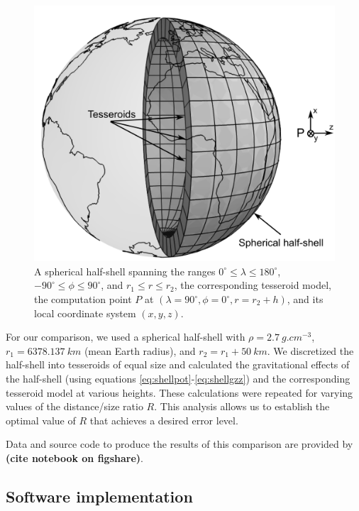 \documentclass[extra]{gji}
\begin{document}
\begin{figure}
    \centering
    \includegraphics[width=\columnwidth]{figs/spherical-shell}
    \caption{A spherical half-shell
        spanning the ranges $0^{\circ} \le \lambda \le 180^\circ$,
        $-90^\circ \le \phi \le 90^\circ$,
        and $r_1 \le r \le r_2$,
        the corresponding tesseroid model,
        the computation point $P$
        at $(\lambda=90^\circ,\phi=0^\circ,r=r_2+h)$,
        and its local coordinate system $(x, y, z)$.
    }
    \label{fig:shell}
\end{figure}

For our comparison,
we used a spherical half-shell with
$\rho=2.7\ g.cm^{-3}$,
$r_1=6378.137\ km$ (mean Earth radius),
and
$r_2 = r_1 + 50\ km$.
We discretized the half-shell
into tesseroids of equal size
and calculated the gravitational effects of
the half-shell
(using equations \ref{eq:shellpot}-\ref{eq:shellgzz})
and the corresponding tesseroid model
at various heights.
These calculations were repeated
for varying values of
the distance/size ratio $R$.
This analysis
allows us to establish
the optimal value of $R$
that achieves a desired error level.

Data and source code to produce the results of this comparison
are provided by \textbf{(cite notebook on figshare)}.

\subsection{Software implementation}
\end{document}
